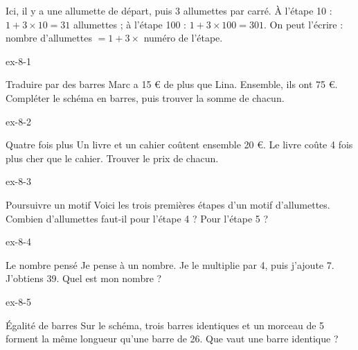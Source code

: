 \begin{savoirfaire}Ici, il y a une allumette de départ, puis 3 allumettes par carré. À l’étape 10 : $1+3\times10=31$ allumettes ; à l’étape 100 : $1+3\times100=301$. On peut l’écrire : nombre d’allumettes $=1+3\times$ numéro de l’étape.\end{savoirfaire}

\clearpage{}
\begin{blocLivre}{ex-8-1}\begin{exercice}[1]{Traduire par des barres}
Marc a 15 € de plus que Lina. Ensemble, ils ont 75 €. Compléter le schéma en barres, puis trouver la somme de chacun.
\label{fig-ex-8-1}
\end{exercice}\end{blocLivre}
\begin{blocLivre}{ex-8-2}\begin{exercice}[1]{Quatre fois plus}
Un livre et un cahier coûtent ensemble 20 €. Le livre coûte 4 fois plus cher que le cahier. Trouver le prix de chacun.
\end{exercice}\end{blocLivre}
\begin{blocLivre}{ex-8-3}\begin{exercice}[1]{Poursuivre un motif}
Voici les trois premières étapes d’un motif d’allumettes. Combien d’allumettes faut-il pour l’étape 4 ? Pour l’étape 5 ?
\label{fig-ex-8-3}
\end{exercice}\end{blocLivre}
\begin{blocLivre}{ex-8-4}\begin{exercice}[1]{Le nombre pensé}
Je pense à un nombre. Je le multiplie par 4, puis j’ajoute 7. J’obtiens 39. Quel est mon nombre ?
\end{exercice}\end{blocLivre}
\begin{blocLivre}{ex-8-5}\begin{exercice}[1]{Égalité de barres}
Sur le schéma, trois barres identiques et un morceau de 5 forment la même longueur qu’une barre de 26. Que vaut une barre identique ?
\label{fig-ex-8-5}
\end{exercice}\end{blocLivre}


